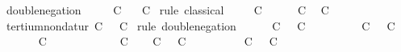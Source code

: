 \begin{isabellebody}
\isanewline
\isanewline
{}\isamarkupfalse%
\ double{\isacharunderscore}negation{\isacharcolon}\isanewline
\ \ \ {\isachardoublequoteopen}{\isasymnot}\ {\isasymnot}\ C{\isachardoublequoteclose}\isanewline
\ \ \ C\isanewline
%
\isadelimproof
%
\endisadelimproof
%
\isatagproof
{}\isamarkupfalse%
\ {\isacharparenleft}rule\ classical{\isacharparenright}\isanewline
\ \ \isamarkupfalse%
\ {\isachardoublequoteopen}{\isasymnot}\ C{\isachardoublequoteclose}\isanewline
\ \ \isamarkupfalse%
\ {\isacharbackquoteopen}{\isasymnot}\ {\isasymnot}\ C{\isacharbackquoteclose}\ \isamarkupfalse%
\ C\ \isacommand{{\isachardot}{\isachardot}}\isamarkupfalse%
\isanewline
{}\isamarkupfalse%
%
\endisatagproof
{\isafoldproof}%
%
\isadelimproof
\isanewline
%
\endisadelimproof
\isanewline
{}\isamarkupfalse%
\ tertium{\isacharunderscore}non{\isacharunderscore}datur{\isacharcolon}\ {\isachardoublequoteopen}C\ {\isasymor}\ {\isasymnot}\ C{\isachardoublequoteclose}\isanewline
%
\isadelimproof
%
\endisadelimproof
%
\isatagproof
{}\isamarkupfalse%
\ {\isacharparenleft}rule\ double{\isacharunderscore}negation{\isacharparenright}\isanewline
\ \ \isamarkupfalse%
\ {\isachardoublequoteopen}{\isasymnot}\ {\isasymnot}\ {\isacharparenleft}C\ {\isasymor}\ {\isasymnot}\ C{\isacharparenright}{\isachardoublequoteclose}\isanewline
\ \ \isamarkupfalse%
\isanewline
\ \ \ \ \isamarkupfalse%
\ {\isachardoublequoteopen}{\isasymnot}\ {\isacharparenleft}C\ {\isasymor}\ {\isasymnot}\ C{\isacharparenright}{\isachardoublequoteclose}\isanewline
\ \ \ \ \isamarkupfalse%
\ {\isachardoublequoteopen}{\isasymnot}\ C{\isachardoublequoteclose}\isanewline
\ \ \ \ \isamarkupfalse%
\isanewline
\ \ \ \ \ \ \isamarkupfalse%
\ C\ \isamarkupfalse%
\ \isamarkupfalse%
\ {\isachardoublequoteopen}C\ {\isasymor}\ {\isasymnot}\ C{\isachardoublequoteclose}\ \isacommand{{\isachardot}{\isachardot}}\isamarkupfalse%
\isanewline
\ \ \ \ \ \ \isamarkupfalse%
\ {\isacharbackquoteopen}{\isasymnot}\ {\isacharparenleft}C\ {\isasymor}\ {\isasymnot}\ C{\isacharparenright}{\isacharbackquoteclose}\ \isamarkupfalse%
\ {\isasymbottom}\ \isacommand{{\isachardot}{\isachardot}}\isamarkupfalse%
\isanewline
\ \ \ \ \isamarkupfalse%
\isanewline
\ \ \ \ \isamarkupfalse%

\end{isabellebody}

